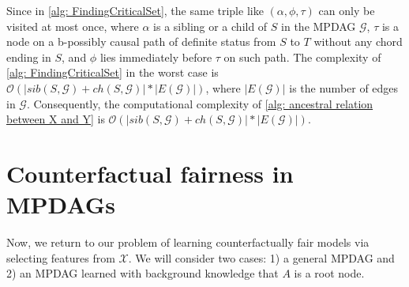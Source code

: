 \documentclass{article}
\begin{document}
Since in \cref{alg: FindingCriticalSet}, the same triple like $(\alpha, \phi, \tau)$ can only be visited at most once, where $\alpha$ is a sibling or a child of $S$ in the MPDAG $\mathcal{G}$, $\tau$ is a node on a b-possibly causal path of definite status from $S$ to $T$ without any chord ending in $S$, and $\phi$ lies immediately before $\tau$ on such path. The complexity of \cref{alg: FindingCriticalSet} in the worst case is $\mathcal{O}(|sib(S,\mathcal{G})+ch(S,\mathcal{G})|*|E(\mathcal{G})|)$, where $|E(\mathcal{G})|$ is the number of edges in $\mathcal{G}$. Consequently, the computational complexity of \cref{alg: ancestral relation between X and Y} is $\mathcal{O}(|sib(S,\mathcal{G})+ch(S,\mathcal{G})|*|E(\mathcal{G})|)$.

\section{Counterfactual fairness in MPDAGs}\label{sec: Counterfactual Fairness in MPDAGs}
Now, we return to our problem of learning counterfactually fair models via selecting features from $\mathcal{X}$. We will consider two cases: 1) a general MPDAG and 2) an MPDAG learned with background knowledge that $A$ is a root node.



\end{document}
